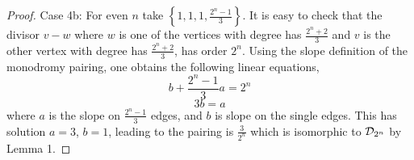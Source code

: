 \documentclass{amsart}
\begin{document}
\begin{proof}
    Case 4b: For even $n$ take $\left\{1, 1, 1,
\frac{2^{n}-1}{3}\right\}$. It is easy to check that the divisor $v-w$
where $w$ is one of the vertices with degree has $\frac{2^{n}+2}{3}$
and $v$ is the other vertex with degree has $\frac{2^{n}+2}{3}$, has
order $2^{n}$. Using the slope definition of the monodromy pairing,
one obtains the following linear equations,
     \[ b+ \frac{2^{n}-1}{3}a=2^{n}
     \]
     \[ 3b=a
     \] where $a$ is the slope on $ \frac{2^{n}-1}{3}$ edges, and $b$
is slope on the single edges. This has solution $a=3$, $b=1$, leading
to the pairing is $\frac{3}{2^{n}}$ which is isomorphic to $\mathcal{D}_{2^{n}}$ by
Lemma 1.
 \end{proof}






































  
\end{document}
